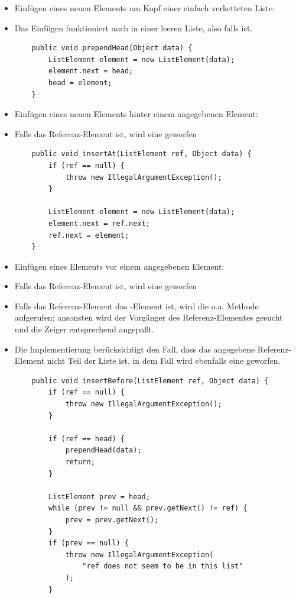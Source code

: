 \begin{itemize}
    \item Einfügen eines neuen Elements am Kopf einer einfach verketteten Liste:
    \item[] Das Einfügen funktioniert auch in einer leeren Liste, also falls  ist.
    \begin{verbatim}
    public void prependHead(Object data) {
        ListElement element = new ListElement(data);
        element.next = head;
        head = element;
    }
    \end{verbatim}
    \item Einfügen eines neuen Elements hinter einem angegebenen Element:
    \item[] Falls das Referenz-Element  ist, wird eine  geworfen
    \begin{verbatim}
    public void insertAt(ListElement ref, Object data) {
        if (ref == null) {
            throw new IllegalArgumentException();
        }

        ListElement element = new ListElement(data);
        element.next = ref.next;
        ref.next = element;
    }
    \end{verbatim}
    \item Einfügen eines Elements vor einem angegebenen Element:
    \item[] Falls das Referenz-Element  ist, wird eine  geworfen
    \item[] Falls das Referenz-Element das -Element ist, wird die o.a. Methode 
    aufgerufen; ansonsten wird der Vorgänger des Referenz-Elementes gesucht und die Zeiger entsprechend angepaßt.
    \item[] Die Implementierung berücksichtigt den Fall, dass das angegebene Referenz-Element nicht Teil der Liste
    ist, in dem Fall wird ebenfalls eine  geworfen.
    \begin{verbatim}
    public void insertBefore(ListElement ref, Object data) {
        if (ref == null) {
            throw new IllegalArgumentException();
        }

        if (ref == head) {
            prependHead(data);
            return;
        }

        ListElement prev = head;
        while (prev != null && prev.getNext() != ref) {
            prev = prev.getNext();
        }
        if (prev == null) {
            throw new IllegalArgumentException(
                "ref does not seem to be in this list"
            );
        }


\end{verbatim}
\end{itemize}
